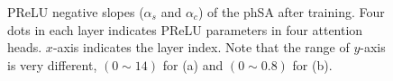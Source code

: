 \begin{figure}[t]
    \centering
    \caption{PReLU negative slopes ($\alpha_s$ and $\alpha_c$) of the phSA after training.
    Four dots in each layer indicates PReLU parameters in four attention heads.
    $x$-axis indicates the layer index.
    Note that the range of $y$-axis is very different, $(0\sim 14)$ for (a) and $(0\sim 0.8)$ for (b).}
    \label{fig:prelu}
    \vspace{0.2cm}
\end{figure}

